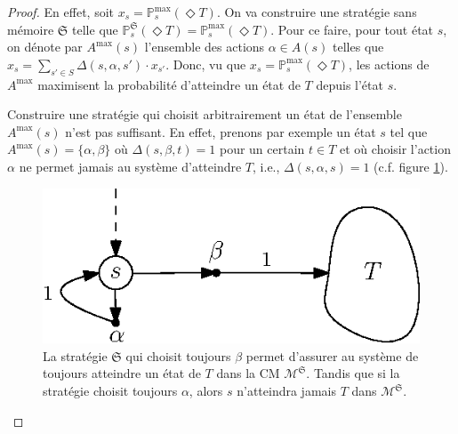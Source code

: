 \documentclass[12pt,a4paper]{report}
\theoremstyle{definition}%
\theoremstyle{remark}
\newcommand{\pr}{\mathbb{P}}
\begin{document}
\begin{proof}
	En effet, soit $x_s = \pr^{\max}_s(\Diamond T)$. On va construire une
	stratégie sans mémoire $\mathfrak{S}$ telle que
	$\pr^\mathfrak{S}_s(\Diamond T) = \pr^{\max}_s(\Diamond T)$.
	Pour ce faire, pour tout état $s$, on dénote par $A^{\max}(s)$ l'ensemble des
	actions $\alpha \in A(s)$ telles que
	$
		x_s = \sum_{s' \in S} \Delta(s, \alpha, s') \cdot x_{s'}
	$. Donc, vu que $x_s = \pr^{\max}_s(\Diamond T)$, les actions de $A^{\max}$
	maximisent la probabilité d'atteindre un état de $T$ depuis l'état $s$.
	\par Construire une stratégie qui choisit arbitrairement un état de l'ensemble
	$A^{\max}(s)$ n'est pas suffisant. En effet, prenons par exemple un état $s$
	tel que $A^{\max}(s) = \{\alpha, \beta\}$ où $\Delta(s, \beta, t) = 1$ pour un
	certain $t \in T$ et où choisir l'action $\alpha$ ne permet jamais au système
	d'atteindre $T$, i.e., $\Delta(s, \alpha, s) = 1$ (c.f. figure
	\ref{accessibilite-preuve-strat}).

	\begin{figure}[H]
		\center
		\captionsetup{justification=centering}
		\includegraphics{figures/accessibilite-preuve}
		\caption{La stratégie $\mathfrak{S}$ qui choisit toujours $\beta$ permet
			d'assurer au système de toujours atteindre un état de $T$ dans la CM
			$\mathcal{M}^\mathfrak{S}$. Tandis que si la stratégie choisit
			toujours $\alpha$, alors $s$ n'atteindra jamais
			$T$ dans $\mathcal{M}^\mathfrak{S}$.}
			\label{accessibilite-preuve-strat}
	\end{figure}


\end{proof}
\end{document}
